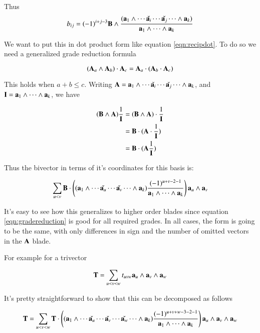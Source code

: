 \documentclass{article}      %
\begin{document}
Thus 
\begin{equation}\label{eqn:bivectorrecip}
b_{ij} = (-1)^{i+j-3}\mathbf{B} \wedge
\frac{ (\mathbf{a}_1 \wedge \cdots \check{\mathbf{a}_i} \cdots \check{\mathbf{a}_j} \cdots \wedge \mathbf{a}_k) }
{\mathbf{a}_1 \wedge \cdots \wedge \mathbf{a}_k}
\end{equation}

We want to put this in dot product form like equation \ref{eqn:recipdot}.  To do so we need a generalized grade reduction formula

\begin{equation}\label{eqn:gradereduction}
(\mathbf{A}_a \wedge \mathbf{A}_b) \cdot \mathbf{A}_c = \mathbf{A}_a \cdot (\mathbf{A}_b \cdot \mathbf{A}_c)
\end{equation}

This holds when $a + b \le c$.  Writing 
$\mathbf{A} = \mathbf{a}_1 \wedge \cdots \check{\mathbf{a}_i} \cdots \check{\mathbf{a}_j} \cdots \wedge \mathbf{a}_k$, and
$\mathbf{I} = \mathbf{a}_1 \wedge \cdots \wedge \mathbf{a}_k$, we have

\begin{align*}
(\mathbf{B} \wedge \mathbf{A}) \frac{1}{\mathbf{I}}
&= (\mathbf{B} \wedge \mathbf{A}) \cdot \frac{1}{\mathbf{I}} \\
&= \mathbf{B} \cdot (\mathbf{A} \cdot \frac{1}{\mathbf{I}}) \\
&= \mathbf{B} \cdot (\mathbf{A} \frac{1}{\mathbf{I}}) \\
\end{align*}

Thus the bivector in terms of it's coordinates for this basis is:

\begin{equation}
\sum_{u<v} 
\mathbf{B} \cdot
\left(
(\mathbf{a}_1 \wedge \cdots \check{\mathbf{a}_u} \cdots \check{\mathbf{a}_v} \cdots \wedge \mathbf{a}_k)
\frac{(-1)^{u+v-2-1}}
{\mathbf{a}_1 \wedge \cdots \wedge \mathbf{a}_k}
\right)
\mathbf{a}_u \wedge \mathbf{a}_v
\end{equation}

It's easy to see how this generalizes to higher order blades since 
equation \ref{eqn:gradereduction} is good for all required grades.  In all cases, the form is going to be the same, with only differences
in sign and the number of omitted vectors in the $\mathbf{A}$ blade.

For example for a trivector

\[
\mathbf{T} = \sum_{u<v<w}t_{uvw} \mathbf{a}_u \wedge \mathbf{a}_v \wedge \mathbf{a}_w
\]

It's pretty straightforward to show that this can be decomposed as follows

\[
\mathbf{T} = \sum_{u<v<w} \mathbf{T} \cdot
\left(
(\mathbf{a}_1 \wedge \cdots \check{\mathbf{a}_u} \cdots \check{\mathbf{a}_v} \cdots \check{\mathbf{a}_w} \cdots \wedge \mathbf{a}_k)
\frac{(-1)^{u+v+w-3-2-1}}
{\mathbf{a}_1 \wedge \cdots \wedge \mathbf{a}_k}
\right)
\mathbf{a}_u \wedge \mathbf{a}_v \wedge \mathbf{a}_w
\]
\end{document}
